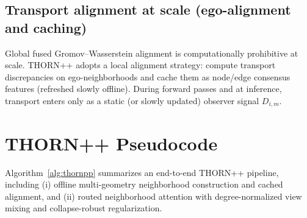 \documentclass[11pt]{article}
\begin{document}
\subsection{Transport alignment at scale (ego-alignment and caching)}

Global fused Gromov--Wasserstein alignment is computationally prohibitive at scale. THORN++ adopts a local alignment strategy: compute transport discrepancies on ego-neighborhoods and cache them as node/edge consensus features (refreshed slowly offline). During forward passes and at inference, transport enters only as a static (or slowly updated) observer signal $D_{i,m}$.

\section{THORN++ Pseudocode}

Algorithm~\ref{alg:thornpp} summarizes an end-to-end THORN++ pipeline, including (i) offline multi-geometry neighborhood construction and cached alignment, and (ii) routed neighborhood attention with degree-normalized view mixing and collapse-robust regularization.
\end{document}
